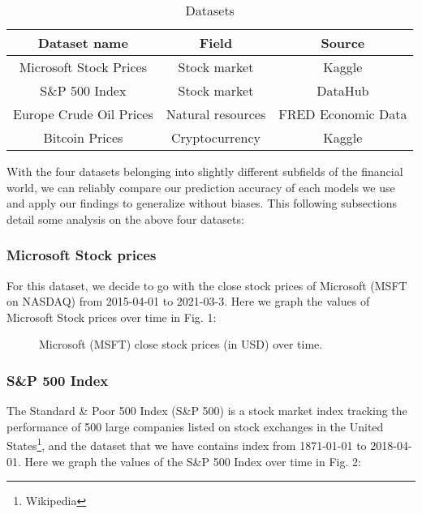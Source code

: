 \documentclass[letterpaper, 10 pt, conference]{ieeeconf}  %
\begin{document}
    \begin{table}[h!] \centering
        \caption{Datasets }
        \begin{threeparttable}
                \begin{tabular}{|c||c|c|}
                    \hline
                    Dataset name & Field & Source\\
                    \hline
                    Microsoft Stock Prices & Stock market & Kaggle\tablefootnote{\url{https://www.kaggle.com/vijayvvenkitesh/microsoft-stock-time-series-analysis}}\\
                    S\&P 500 Index & Stock market & DataHub\tablefootnote{\url{https://datahub.io/core/s-and-p-500}}\\
                    Europe Crude Oil Prices & Natural resources & FRED Economic Data\tablefootnote{\url{https://fred.stlouisfed.org/series/DCOILBRENTEU}}\\
                    Bitcoin Prices & Cryptocurrency & Kaggle\tablefootnote{\url{https://www.kaggle.com/sudalairajkumar/cryptocurrencypricehistory}}\\
                    \hline
                \end{tabular}
        \end{threeparttable}
    \end{table}

    With the four datasets belonging into slightly different subfields of the financial world, we can reliably compare our prediction accuracy of each models we use and apply our findings to generalize without biases. This following subsections detail some analysis on the above four datasets:

    \subsubsection{Microsoft Stock prices} For this dataset, we decide to go with the close stock prices of Microsoft (MSFT on NASDAQ) from 2015-04-01 to 2021-03-3. Here we graph the values of Microsoft Stock prices over time in Fig. 1:
    \begin{figure}[thpb]
        \centering
        \caption{Microsoft (MSFT) close stock prices (in USD) over time.}
        \label{figurelabel}
     \end{figure}
    
    \subsubsection{S\&P 500 Index} The Standard \& Poor 500 Index (S\&P 500) is a stock market index tracking the performance of 500 large companies listed on stock exchanges in the United States\footnote{Wikipedia}, and the dataset that we have contains index from 1871-01-01 to 2018-04-01. Here we graph the values of the S\&P 500 Index over time in Fig. 2:
\end{document}
